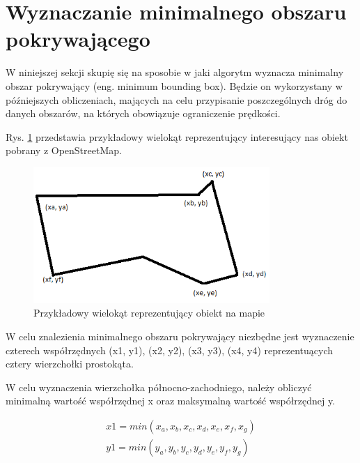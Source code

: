 \newpage
\section{Wyznaczanie minimalnego obszaru pokrywającego}
\label{sec:Wyznaczanieminimalnegoobszarupokrywającego}

W niniejszej sekcji skupię się na sposobie w jaki algorytm wyznacza minimalny obszar pokrywający (eng. minimum bounding box). Będzie on wykorzystany w późniejszych obliczeniach, mających na celu przypisanie poszczególnych dróg do danych obszarów, na których obowiązuje ograniczenie prędkości.

Rys. \ref{sec:minBoundingBoxFirst} przedstawia przykładowy wielokąt reprezentujący interesujący nas obiekt pobrany z OpenStreetMap.

\begin{figure}[h]
\caption{Przykładowy wielokąt reprezentujący obiekt na mapie}
\label{sec:minBoundingBoxFirst}
\centering
\includegraphics[width=0.8\textwidth]{minBoundingBoxFirst}
\end{figure}

W celu znalezienia minimalnego obszaru pokrywający niezbędne jest wyznaczenie czterech współrzędnych (x1, y1), (x2, y2), (x3, y3), (x4, y4) reprezentuących cztery wierzchołki prostokąta.

W celu wyznaczenia wierzchołka północno-zachodniego, należy obliczyć minimalną wartość współrzędnej x oraz maksymalną wartość współrzędnej y.

\begin{equation} \label{sec:drugiWierzcholek}
\begin{split}
x1 = min(x_a, x_b, x_c, x_d, x_e, x_f, x_g) \\
y1 = min(y_a, y_b, y_c, y_d, y_e, y_f, y_g)
\end{split}
\end{equation}\newline

